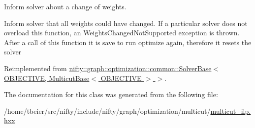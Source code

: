 Inform solver about a change of weights. 

Inform solver that all weights could have changed. If a particular solver does not overload this function, an Weights\+Changed\+Not\+Supported exception is thrown. After a call of this function it is save to run optimize again, therefore it resets the solver 

Reimplemented from \hyperlink{classnifty_1_1graph_1_1optimization_1_1common_1_1SolverBase_a8ab38d61068370e24cca475ef1b5d8b1}{nifty\+::graph\+::optimization\+::common\+::\+Solver\+Base$<$ O\+B\+J\+E\+C\+T\+I\+V\+E, Multicut\+Base$<$ O\+B\+J\+E\+C\+T\+I\+V\+E $>$ $>$}.



The documentation for this class was generated from the following file\+:\begin{DoxyCompactItemize}
\item 
/home/tbeier/src/nifty/include/nifty/graph/optimization/multicut/\hyperlink{multicut__ilp_8hxx}{multicut\+\_\+ilp.\+hxx}\end{DoxyCompactItemize}
